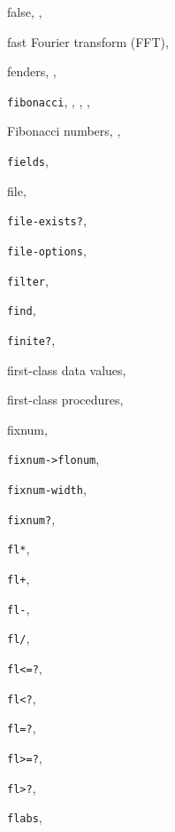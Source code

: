 {\begin{multicols}{2}
false, \pageref{intro_s37}, \pageref{start_s107}
  
fast Fourier transform (FFT), \pageref{examples_s70}
  
fenders, \pageref{syntax_s31}, \pageref{syntax_s36}
  
\texttt{fibonacci}, \pageref{further_s47}, \pageref{binding_s33}, \pageref{control_s28}, \pageref{examples_s92}
  
Fibonacci numbers, \pageref{further_s48}, \pageref{binding_s32}
  
\texttt{fields}, \textit{\pageref{records_s16}}
  
file, \pageref{io_s3}
  
\texttt{file-exists?}, \textit{\pageref{io_s89}}
  
\texttt{file-options}, \textit{\pageref{io_s26}}
  
\texttt{filter}, \textit{\pageref{objects_s55}}
  
\texttt{find}, \textit{\pageref{objects_s57}}
  
\texttt{finite?}, \textit{\pageref{objects_s97}}
  
first-class data values, \pageref{intro_s4}
  
first-class procedures, \pageref{intro_s18}
  
fixnum, \pageref{objects_s149}
  
\texttt{fixnum-\textgreater{}flonum}, \textit{\pageref{objects_s198}}
  
\texttt{fixnum-width}, \textit{\pageref{objects_s152}}
  
\texttt{fixnum?}, \textit{\pageref{objects_s150}}
  
\texttt{fl*}, \textit{\pageref{objects_s186}}
  
\texttt{fl+}, \textit{\pageref{objects_s184}}
  
\texttt{fl-}, \textit{\pageref{objects_s185}}
  
\texttt{fl/}, \textit{\pageref{objects_s187}}
  
\texttt{fl\textless{}=?}, \textit{\pageref{objects_s178}}
  
\texttt{fl\textless{}?}, \textit{\pageref{objects_s178}}
  
\texttt{fl=?}, \textit{\pageref{objects_s178}}
  
\texttt{fl\textgreater{}=?}, \textit{\pageref{objects_s178}}
  
\texttt{fl\textgreater{}?}, \textit{\pageref{objects_s178}}
  
\texttt{flabs}, \textit{\pageref{objects_s192}}
  

\end{multicols}}
